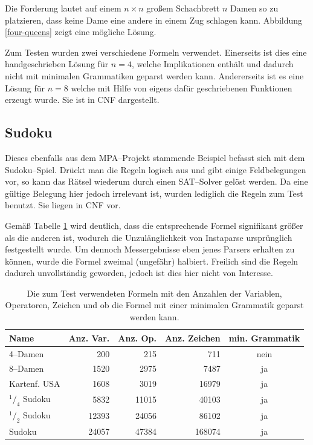 \documentclass[ngerman,a4paper,abstracton,open=right,twoside=false,toc=listofnumbered,bibtotocnumbered]{scrreprt}
\begin{document}
Die Forderung lautet auf einem $n \times n$ großem Schachbrett $n$ Damen so zu platzieren, dass keine Dame eine andere in einem Zug schlagen kann. Abbildung \ref{four-queens} zeigt eine mögliche Lösung.

Zum Testen wurden zwei verschiedene Formeln verwendet. Einerseits ist dies eine handgeschrieben Lösung für $n = 4$, welche Implikationen enthält und dadurch nicht mit minimalen Grammatiken geparst werden kann. Andererseits ist es eine Lösung für $n = 8$ welche mit Hilfe von eigens dafür geschriebenen Funktionen erzeugt wurde. Sie ist in CNF dargestellt.

\subsection{Sudoku}

Dieses ebenfalls aus dem MPA--Projekt stammende Beispiel befasst sich mit dem Sudoku--Spiel. Drückt man die Regeln logisch aus und gibt einige Feldbelegungen vor, so kann das Rätsel wiederum durch einen SAT--Solver gelöst werden. Da eine gültige Belegung hier jedoch irrelevant ist, wurden lediglich die Regeln zum Test benutzt. Sie liegen in CNF vor.

Gemäß Tabelle \ref{formeln-zahlen} wird deutlich, dass die entsprechende Formel signifikant größer als die anderen ist, wodurch die Unzulänglichkeit von Instaparse ursprünglich festgestellt wurde. Um dennoch Messergebnisse eben jenes Parsers erhalten zu können, wurde die Formel zweimal (ungefähr) halbiert. Freilich sind die Regeln dadurch unvollständig geworden, jedoch ist dies hier nicht von Interesse.

\begin{table}[h]
	\begin{tabular}{|l|r|r|r|c|}
		\hline
		\textbf{Name} & \textbf{Anz. Var.} & \textbf{Anz. Op.} & \textbf{Anz. Zeichen} & \textbf{min. Grammatik} \\ \hline
		4--Damen & 200 & 215 & 711 & nein \\ \hline
		8--Damen & 1520 & 2975 & 7487 & ja \\ \hline
		Kartenf. USA & 1608 & 3019 & 16979 & ja \\ \hline
		$^1/_4$ Sudoku & 5832 & 11015 & 40103 & ja \\ \hline
		$^1/_2$ Sudoku & 12393 & 24056 & 86102 & ja \\ \hline
		Sudoku & 24057 & 47384 & 168074 & ja \\ \hline
	\end{tabular}
	\caption{Die zum Test verwendeten Formeln mit den Anzahlen der Variablen, Operatoren, Zeichen und ob die Formel mit einer minimalen Grammatik geparst werden kann.}
	\label{formeln-zahlen}
\end{table}
\end{document}
